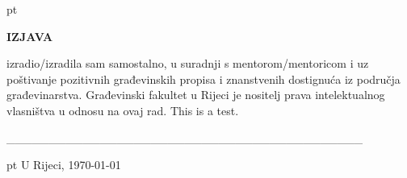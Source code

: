 \thispagestyle{empty}
\mbox{}
\thispagestyle{empty}


 pt

\begin{center}
{\fontsize{14pt}{16.8pt}\selectfont \textbf{IZJAVA}\par}\par
\end{center}\par

\vspace{\baselineskip}

\vspace{\baselineskip}

\begin{justify}
	\begin{onehalfspace}
\vrsta izradio/izradila sam samostalno, u suradnji s mentorom/mentoricom i uz poštivanje pozitivnih građevinskih propisa i znanstvenih dostignuća iz područja građevinarstva. Građevinski fakultet u Rijeci je nositelj prava intelektualnog vlasništva u odnosu na ovaj rad.
This is a test.
	\end{onehalfspace}

\end{justify}\par

\vspace{\baselineskip}

\vspace{\baselineskip}

\vspace{\baselineskip}
\_\_\_\_\_\_\_\_\_\_\_\_\_\_\_\_\_\_\_\_\_\_\_\_\_\_\_\_\_\_\_\_\_\_\_\_\_\_\_\_\_\_ \par

{\autor}\par



 pt
U Rijeci, {\today}\par

\newpage

\thispagestyle{empty}
\mbox{}
\thispagestyle{empty}